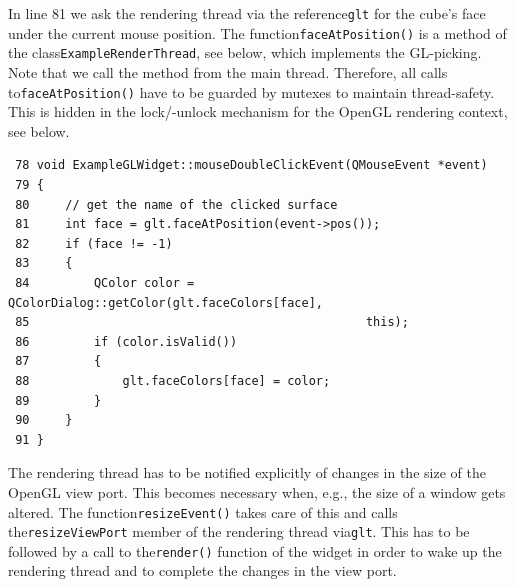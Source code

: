 \documentclass[prodmode,acmtopc]{acmsmall}
\begin{document}
In line 81 we ask the rendering thread via the reference\lstinline|glt| for the cube's face under the current mouse position.
%
The function\lstinline|faceAtPosition()| is a method of the class\lstinline|ExampleRenderThread|, see below, which implements the GL-picking.
%
Note that we call the method from the main thread.
%
Therefore, all calls to\lstinline|faceAtPosition()| have to be guarded by mutexes to maintain thread-safety.
%
This is hidden in the lock/-unlock mechanism for the OpenGL rendering context, see below.
\begin{lstlisting}
 78 void ExampleGLWidget::mouseDoubleClickEvent(QMouseEvent *event)
 79 {
 80     // get the name of the clicked surface
 81     int face = glt.faceAtPosition(event->pos());
 82     if (face != -1)
 83     {
 84         QColor color = QColorDialog::getColor(glt.faceColors[face],
 85                                               this);
 86         if (color.isValid())
 87         {
 88             glt.faceColors[face] = color;
 89         }
 90     }
 91 }
\end{lstlisting}
%
%
The rendering thread has to be notified explicitly of changes in the size of the OpenGL view port. 
%
%
This becomes necessary when, e.g., the size of a window gets altered.
%
The function\lstinline|resizeEvent()| takes care of this and calls the\lstinline|resizeViewPort| member of the rendering thread via\lstinline|glt|.
%
This has to be followed by a call to the\lstinline|render()| function of the widget in order to wake up the rendering thread and to complete the changes in the view port.
\end{document}
